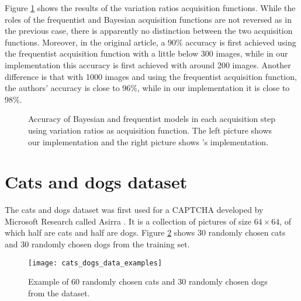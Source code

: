 Figure \ref{fig:mnist_var_ratios_AL} shows the results of the variation ratios acquisition functions. While the roles of the frequentist and Bayesian acquisition functions are not reversed as in the previous case, there is apparently no distinction between the two acquisition functions. Moreover, in the original article, a 90\% accuracy is first achieved using the frequentist acquisition function with a little below 300 images, while in our implementation this accuracy is first achieved with around 200 images. Another difference is that with 1000 images and using the frequentist acquisition function, the authors' accuracy is close to 96\%, while in our implementation it is close to 98\%.

\begin{figure}[H]
  \centering
  \hfill
  \caption{Accuracy of Bayesian and frequentist models in each acquisition step using variation ratios as acquisition function. The left picture shows our implementation and the right picture shows \citeauthor{Gal2016Active}'s implementation.}
  \label{fig:mnist_var_ratios_AL}
\end{figure}


\section{Cats and dogs dataset}

The cats and dogs dataset was first used for a CAPTCHA developed by Microsoft Research called Asirra \cite{elson2007asirra}. It is a collection of  pictures of size $64 \times 64$, of which half are cats and half are dogs. Figure \ref{fig:cats_dogs_data_examples} shows 30 randomly chosen cats and 30 randomly chosen dogs from the training set.

\begin{figure}[H]
    \centering
    \texttt{[image: cats\_dogs\_data\_examples]}
    \caption{Example of 60 randomly chosen cats and 30 randomly chosen dogs from the dataset.}
    \label{fig:cats_dogs_data_examples}
\end{figure}

